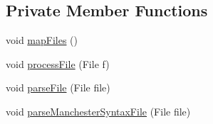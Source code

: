 \subsection*{Private Member Functions}
\begin{DoxyCompactItemize}
\item 
void \hyperlink{classorg_1_1semanticweb_1_1owlapi_1_1util_1_1_auto_i_r_i_mapper_a5b9fab9191bdd1bb50ce39989ceec6bd}{map\-Files} ()
\item 
void \hyperlink{classorg_1_1semanticweb_1_1owlapi_1_1util_1_1_auto_i_r_i_mapper_a28c91bcf1ae4d90cd64a499508ef4423}{process\-File} (File f)
\item 
void \hyperlink{classorg_1_1semanticweb_1_1owlapi_1_1util_1_1_auto_i_r_i_mapper_aa5e8583a3a9d3af45e45c8402f5b6925}{parse\-File} (File file)
\item 
void \hyperlink{classorg_1_1semanticweb_1_1owlapi_1_1util_1_1_auto_i_r_i_mapper_a6cfb783e25d4abf23eb9d4e555c4d116}{parse\-Manchester\-Syntax\-File} (File file)
\end{DoxyCompactItemize}
